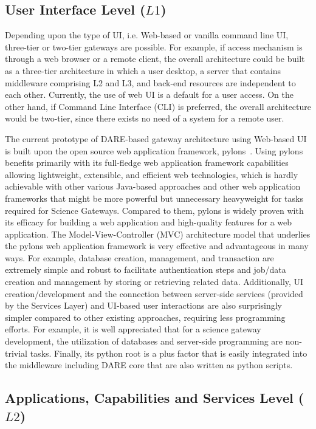 \documentclass[]{svjour3}
\begin{document}
\subsection{User Interface Level ($L1$)}
 Depending upon the
type of UI, i.e. Web-based or vanilla command line UI, three-tier or
two-tier gateways are possible. For example, if access mechanism is
through a web browser or a remote client, the overall architecture
could be built as a three-tier architecture in which a user desktop, a
server that contains middleware comprising L2 and L3, and back-end
resources are independent to each other. Currently, the use of web UI
is a default for a user access. On the other hand, if Command Line
Interface (CLI) is preferred, the overall architecture would be
two-tier, since there exists no need of a system for a remote user.
 
The current prototype of DARE-based gateway architecture using
Web-based UI is built upon the open source web application framework,
pylons~\cite{pylonsurl}. Using pylons benefits primarily with its
full-fledge web application framework capabilities allowing
lightweight, extensible, and efficient web technologies, which is
hardly achievable with other various Java-based approaches and other
web application frameworks that might be more powerful but unnecessary
heavyweight for tasks required for Science Gateways. Compared to them,
pylons is widely proven with its efficacy for building a web
application and high-quality features for a web application.  The
Model-View-Controller (MVC) architecture model that underlies the
pylons web application framework \cite{pylonsurl} is very effective
and advantageous in many ways. For example, database creation,
management, and transaction are extremely simple and robust to
facilitate authentication steps and job/data creation and management
by storing or retrieving related data. Additionally, UI
creation/development and the connection between server-side services
(provided by the Services Layer) and UI-based user interactions are
also surprisingly simpler compared to other existing approaches,
requiring less programming efforts. For example, it is well
appreciated that for a science gateway development, the utilization of
databases and server-side programming are non-trivial tasks. Finally,
its python root is a plus factor that is easily integrated into the
middleware including DARE core that are also written as python
scripts.


\subsection{Applications, Capabilities and Services Level ($L2$)}
\end{document}

